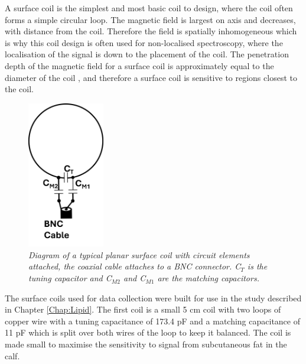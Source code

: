 A surface coil is the simplest and most basic coil to design, where the coil often forms a simple circular loop. The magnetic field is largest on axis and decreases, with distance from the coil. Therefore the field is spatially inhomogeneous which is why this coil design is often used for non-localised spectroscopy, where the localisation of the signal is down to the placement of the coil. The penetration depth of the magnetic field for a surface coil is approximately equal to the diameter of the coil \cite{Gruber2018RFNonphysicists}, and therefore a surface coil is sensitive to regions closest to the coil. 

\begin{figure}
    \centering
    \includegraphics[width=0.3\textwidth]{Figures/Coils/Surface_Coil.png}
    \caption{\textit{Diagram of a typical planar surface coil with circuit elements attached, the coaxial cable attaches to a BNC connector. C$_T$ is the tuning capacitor and C$_{M2}$ and C$_{M1}$ are the matching capacitors.}}
    \label{fig:coils:Surface}
\end{figure}

The surface coils used for data collection were built for use in the study described in Chapter \ref{Chap:Lipid}. The first coil is a small 5 cm coil with two loops of copper wire with a tuning capacitance of 173.4 pF and a matching capacitance of 11 pF which is split over both wires of the loop to keep it balanced. The coil is made small to maximise the sensitivity to signal from subcutaneous fat in the calf.

